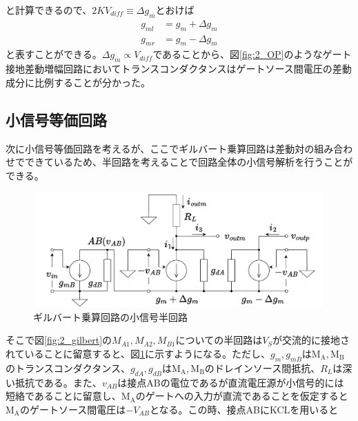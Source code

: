             と計算できるので、$2KV_{diff}\equiv\Delta g_{m}$とおけば
            \begin{align}
                g_{ml}&=g_{m}+\Delta g_{m}   \label{eq:2_dgml}\\
                g_{mr}&=g_{m}-\Delta g_{m}   \label{eq:2_dgmr}
            \end{align}
            と表すことができる。$\Delta g_{m} \propto V_{diff}$であることから、図\ref{fig:2_OP}のようなゲート接地差動増幅回路においてトランスコンダクタンスはゲートソース間電圧の差動成分に比例することが分かった。
            \newpage
            
        \subsection{小信号等価回路}
            次に小信号等価回路を考えるが、ここでギルバート乗算回路は差動対の組み合わせでできているため、半回路を考えることで回路全体の小信号解析を行うことができる。
            \begin{figure}[!b]
                \begin{center}

                    \includegraphics[width=0.99\textwidth]{figures/chapter2/halfeq.pdf}
                    \caption{ギルバート乗算回路の小信号半回路}
                    \label{fig:2_half}

                \end{center}

            \end{figure}
            そこで図\ref{fig:2_gilbert}の$M_{A1},M_{A2},M_{B1}$についての半回路は$V_{S}$が交流的に接地されていることに留意すると、図\ref{fig:2_half}に示すようになる。ただし、$g_{m},g_{mB}$は$\mathrm{M_{A},M_{B}}$のトランスコンダクタンス、$g_{dA},g_{dB}$は$\mathrm{M_{A},M_{B}}$のドレインソース間抵抗、$R_{L}$は深い抵抗である。また、$v_{AB}$は接点ABの電位であるが直流電圧源が小信号的には短絡であることに留意し、$\mathrm{M_{A}}$のゲートへの入力が直流であることを仮定すると$\mathrm{M_{A}}$のゲートソース間電圧は$-V_{AB}$となる。この時、接点ABにKCLを用いると
